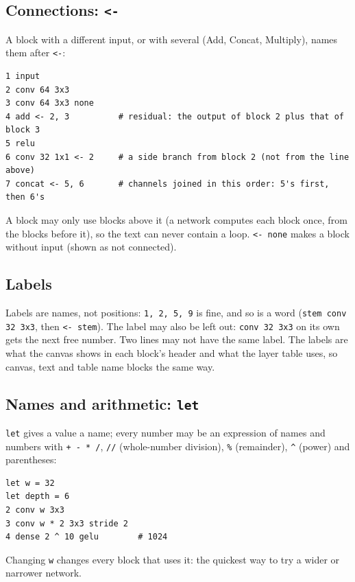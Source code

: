 \subsection{Connections: \texttt{<-}}
A block with a different input, or with several (Add, Concat, Multiply), names them after \texttt{<-}:

\begin{verbatim}
1 input
2 conv 64 3x3
3 conv 64 3x3 none
4 add <- 2, 3          # residual: the output of block 2 plus that of block 3
5 relu
6 conv 32 1x1 <- 2     # a side branch from block 2 (not from the line above)
7 concat <- 5, 6       # channels joined in this order: 5's first, then 6's
\end{verbatim}
A block may only use blocks above it (a network computes each block once, from the blocks before it), so the text can never contain a
loop. \texttt{<- none} makes a block without input (shown as not connected).

\subsection{Labels}
Labels are names, not positions: \texttt{1, 2, 5, 9} is fine, and so is a word (\texttt{stem conv 32 3x3}, then \texttt{<- stem}). The
label may also be left out: \texttt{conv 32 3x3} on its own gets the next free number. Two lines may not have the same label. The labels
are what the canvas shows in each block's header and what the layer table uses, so canvas, text and table name blocks the same way.

\subsection{Names and arithmetic: \texttt{let}}
\texttt{let} gives a value a name; every number may be an expression of names and numbers with \texttt{+ - * /}, \texttt{//}
(whole-number division), \texttt{\%} (remainder), \texttt{\^{}} (power) and parentheses:
\begin{verbatim}
let w = 32
let depth = 6
2 conv w 3x3
3 conv w * 2 3x3 stride 2
4 dense 2 ^ 10 gelu        # 1024
\end{verbatim}
Changing \texttt{w} changes every block that uses it: the quickest way to try a wider or narrower network.

